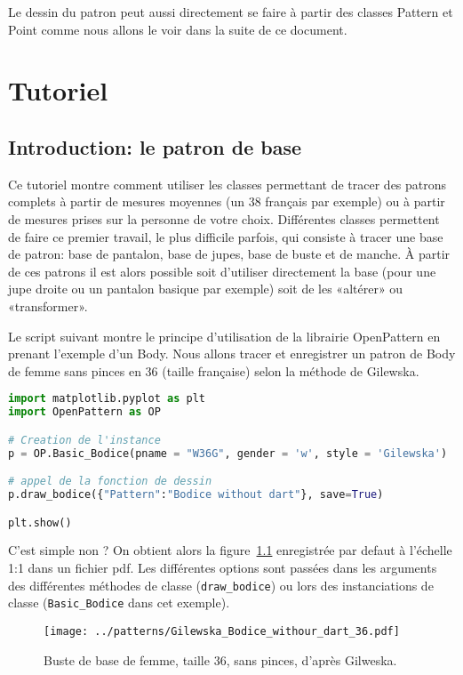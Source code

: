 \documentclass[10pt,a4paper,twoside]{report}
\begin{document}
Le dessin du patron peut aussi  directement se faire à partir des classes Pattern et Point comme nous allons le voir dans la suite de ce document.

\chapter{Tutoriel}

\section{Introduction: le patron de base}

Ce tutoriel montre comment utiliser les classes permettant de tracer des patrons complets à partir de mesures moyennes (un 38 français par exemple) ou à partir de mesures prises sur la personne de votre choix.
Différentes classes permettent de faire ce premier travail, le plus difficile parfois, qui consiste à tracer une base de patron:  base de pantalon, base de jupes, base de buste et de manche. À partir de ces patrons  il est alors  possible soit d'utiliser directement la base (pour une jupe droite ou un pantalon basique par exemple) soit de les «altérer» ou «transformer».

Le script suivant montre le principe d'utilisation de la librairie OpenPattern en prenant l'exemple d'un Body.  Nous allons tracer et enregistrer un patron de Body de femme sans pinces en 36 (taille française) selon la méthode de Gilewska.

\begin{lstlisting}[language=python]
import matplotlib.pyplot as plt
import OpenPattern as OP

# Creation de l'instance
p = OP.Basic_Bodice(pname = "W36G", gender = 'w', style = 'Gilewska')

# appel de la fonction de dessin
p.draw_bodice({"Pattern":"Bodice without dart"}, save=True)

plt.show()
\end{lstlisting}

C'est simple non ? On obtient alors la figure~\ref{fig:bodice_WG36} enregistrée par defaut à l'échelle 1:1 dans un fichier pdf. Les différentes options sont passées dans les arguments des différentes méthodes de classe (\texttt{draw\_bodice}) ou lors des instanciations de classe (\texttt{Basic\_Bodice} dans cet exemple).



\begin{figure}[hbtp]
\centering
\texttt{[image: ../patterns/Gilewska\_Bodice\_withour\_dart\_36.pdf]}
\caption{Buste de base de femme, taille 36, sans pinces, d'après Gilweska.}
\label{fig:bodice_WG36}
\end{figure}
\end{document}
